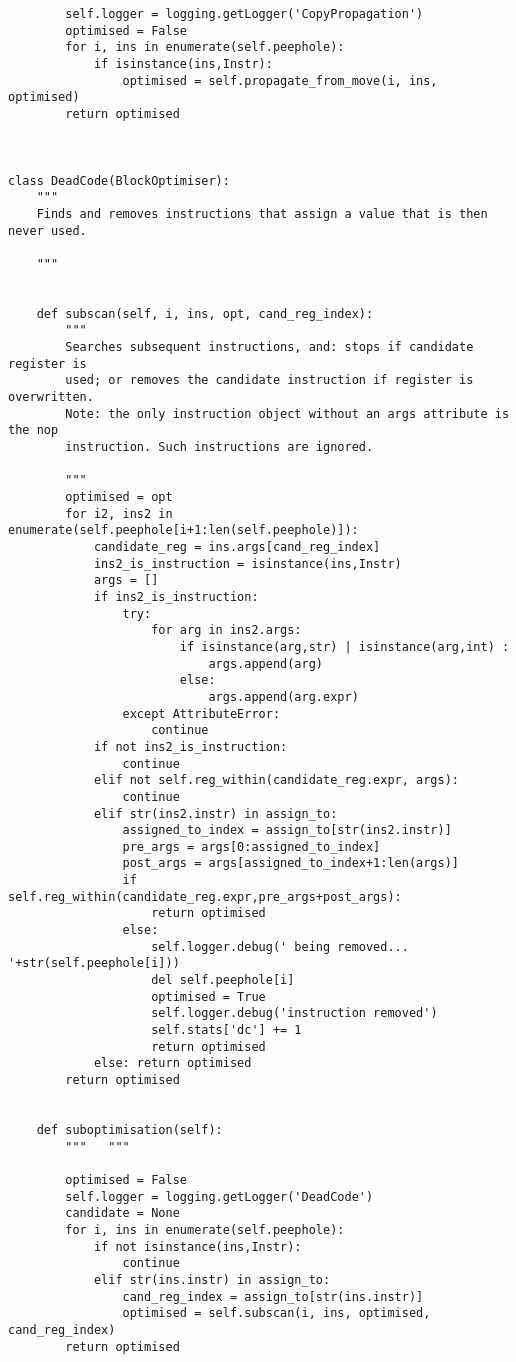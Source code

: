 \begin{lstlisting}
        self.logger = logging.getLogger('CopyPropagation')
        optimised = False
        for i, ins in enumerate(self.peephole):
            if isinstance(ins,Instr):
                optimised = self.propagate_from_move(i, ins, optimised)
        return optimised



class DeadCode(BlockOptimiser):
    """ 
    Finds and removes instructions that assign a value that is then never used.  
    
    """


    def subscan(self, i, ins, opt, cand_reg_index):
        """ 
        Searches subsequent instructions, and: stops if candidate register is
        used; or removes the candidate instruction if register is overwritten.
        Note: the only instruction object without an args attribute is the nop
        instruction. Such instructions are ignored.

        """
        optimised = opt
        for i2, ins2 in enumerate(self.peephole[i+1:len(self.peephole)]):
            candidate_reg = ins.args[cand_reg_index]
            ins2_is_instruction = isinstance(ins,Instr)
            args = []
            if ins2_is_instruction:
                try:
                    for arg in ins2.args:
                        if isinstance(arg,str) | isinstance(arg,int) :
                            args.append(arg)
                        else:
                            args.append(arg.expr)
                except AttributeError:
                    continue
            if not ins2_is_instruction:
                continue
            elif not self.reg_within(candidate_reg.expr, args):
                continue
            elif str(ins2.instr) in assign_to:
                assigned_to_index = assign_to[str(ins2.instr)]
                pre_args = args[0:assigned_to_index]
                post_args = args[assigned_to_index+1:len(args)]
                if self.reg_within(candidate_reg.expr,pre_args+post_args):
                    return optimised
                else: 
                    self.logger.debug(' being removed... '+str(self.peephole[i]))
                    del self.peephole[i]
                    optimised = True
                    self.logger.debug('instruction removed')
                    self.stats['dc'] += 1
                    return optimised
            else: return optimised
        return optimised


    def suboptimisation(self):
        """   """
        
        optimised = False
        self.logger = logging.getLogger('DeadCode')
        candidate = None
        for i, ins in enumerate(self.peephole):
            if not isinstance(ins,Instr):
                continue
            elif str(ins.instr) in assign_to:
                cand_reg_index = assign_to[str(ins.instr)]
                optimised = self.subscan(i, ins, optimised, cand_reg_index)
        return optimised
\end{lstlisting}


